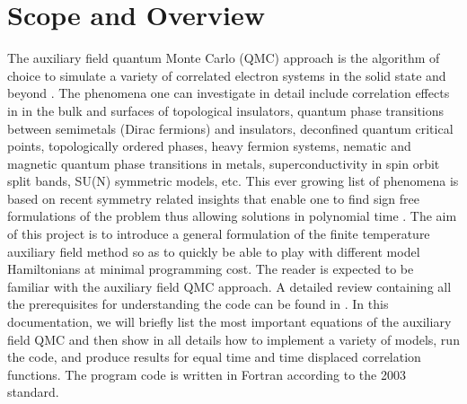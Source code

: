 
\section{Scope and Overview}\label{sec:intro}

The auxiliary field quantum Monte Carlo (QMC) approach is the algorithm of choice to simulate a variety of correlated electron systems in the solid state and beyond \cite{Blankenbecler81,Assaad08_rev}.  
The phenomena  one can investigate in detail include correlation effects in in the bulk and surfaces of topological insulators, quantum phase transitions between semimetals (Dirac fermions)  and insulators,  
deconfined quantum critical points, topologically ordered phases, heavy fermion systems, nematic and magnetic quantum phase transitions in metals,   superconductivity in spin orbit split bands, SU(N) symmetric models,  etc. 
This ever growing list of phenomena is based on  recent symmetry related insights that enable one to  find  sign free formulations of the  problem thus allowing solutions in polynomial time \cite{Wu04,Wei16}.   
The aim of this project is to introduce a general formulation of the finite temperature  auxiliary field method  so as to quickly be able to play with different model Hamiltonians  at  minimal programming cost.      
The reader is expected to be familiar with the auxiliary field QMC  approach. A detailed review containing all  the prerequisites for understanding  the code can be found in \cite{Assaad08_rev}.    
In this documentation, we will briefly list the most important equations of the auxiliary field QMC and then show in all details how to implement a variety of models, run the code, and produce  results for  equal time and time displaced correlation functions. 
The program code is written in Fortran according to the 2003 standard. 

